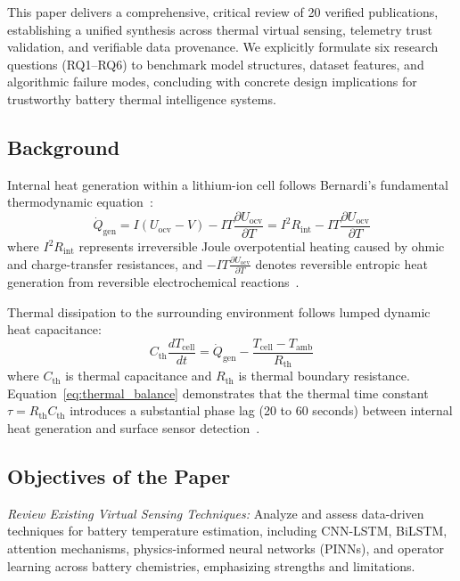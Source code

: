 \documentclass[conference]{IEEEtran}
\begin{document}
This paper delivers a comprehensive, critical review of 20 verified publications, establishing a unified synthesis across thermal virtual sensing, telemetry trust validation, and verifiable data provenance. We explicitly formulate six research questions (RQ1--RQ6) to benchmark model structures, dataset features, and algorithmic failure modes, concluding with concrete design implications for trustworthy battery thermal intelligence systems.

\subsection{Background}
Internal heat generation within a lithium-ion cell follows Bernardi's fundamental thermodynamic equation~\cite{bernardi1985general}:
\begin{equation}
\label{eq:bernardi}
\dot{Q}_{\text{gen}} = I(U_{\text{ocv}} - V) - I T \frac{\partial U_{\text{ocv}}}{\partial T} = I^2 R_{\text{int}} - I T \frac{\partial U_{\text{ocv}}}{\partial T}
\end{equation}
where $I^2 R_{\text{int}}$ represents irreversible Joule overpotential heating caused by ohmic and charge-transfer resistances, and $-I T \frac{\partial U_{\text{ocv}}}{\partial T}$ denotes reversible entropic heat generation from reversible electrochemical reactions~\cite{liu2024study}.

Thermal dissipation to the surrounding environment follows lumped dynamic heat capacitance:
\begin{equation}
\label{eq:thermal_balance}
C_{\text{th}} \frac{dT_{\text{cell}}}{dt} = \dot{Q}_{\text{gen}} - \frac{T_{\text{cell}} - T_{\text{amb}}}{R_{\text{th}}}
\end{equation}
where $C_{\text{th}}$ is thermal capacitance and $R_{\text{th}}$ is thermal boundary resistance. Equation~\eqref{eq:thermal_balance} demonstrates that the thermal time constant $\tau = R_{\text{th}} C_{\text{th}}$ introduces a substantial phase lag (20 to 60 seconds) between internal heat generation and surface sensor detection~\cite{wang2021internal}.

\subsection{Objectives of the Paper}
\textit{Review Existing Virtual Sensing Techniques:} Analyze and assess data-driven techniques for battery temperature estimation, including CNN-LSTM, BiLSTM, attention mechanisms, physics-informed neural networks (PINNs), and operator learning across battery chemistries, emphasizing strengths and limitations.
\end{document}
